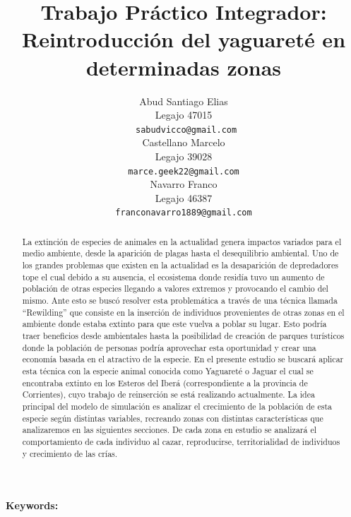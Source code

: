 \documentclass{article}
\title{Trabajo Práctico Integrador: Reintroducción del yaguareté en determinadas zonas}
\author{
    Abud Santiago Elias \\
    Legajo 47015 \\
    \texttt{ sabudvicco@gmail.com} \\
    \And
    Castellano Marcelo \\
    Legajo 39028 \\
    \texttt{marce.geek22@gmail.com} \\
    \And
    Navarro Franco \\
    Legajo 46387 \\
    \texttt{franconavarro1889@gmail.com} \\}
\begin{document}
  \maketitle
  \begin{abstract}
    La extinción de especies de animales en la actualidad genera impactos variados para el medio ambiente, desde la aparición de plagas hasta el desequilibrio ambiental. Uno de los grandes problemas que existen en la actualidad es la desaparición de depredadores tope el cual debido a su ausencia, el ecosistema donde residía tuvo un aumento de población de otras especies llegando a valores extremos y provocando el cambio del mismo. Ante esto se buscó resolver esta problemática a través de una técnica llamada “Rewilding” que consiste en la inserción de individuos provenientes de otras zonas en el ambiente donde estaba extinto para que este vuelva a poblar su lugar. Esto podría traer beneficios desde ambientales hasta la posibilidad de creación de parques turísticos donde la población de personas podría aprovechar esta oportunidad y crear una economía basada en el atractivo de la especie.
    En el presente estudio se buscará aplicar esta técnica con la especie animal conocida como Yaguareté o Jaguar el cual se encontraba extinto en los Esteros del Iberá (correspondiente a la provincia de Corrientes), cuyo trabajo de reinserción se está realizando actualmente. La idea principal del modelo de simulación es analizar el crecimiento de la población de esta especie según distintas variables, recreando zonas con distintas características que analizaremos en las siguientes secciones.
    De cada zona en estudio se analizará el comportamiento de cada individuo al cazar, reproducirse, territorialidad de individuos y crecimiento de las crías.

  \end{abstract}

    \textbf{Keywords:} 

\maketitle
\end{document}
